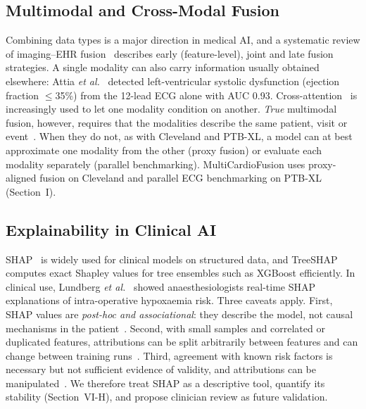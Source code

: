 \subsection{Multimodal and Cross-Modal Fusion}
Combining data types is a major direction in medical AI, and a systematic review of imaging--EHR fusion~\cite{huang2020fusion} describes early (feature-level), joint and late fusion strategies. A single modality can also carry information usually obtained elsewhere: Attia \emph{et al.}~\cite{attia2019} detected left-ventricular systolic dysfunction (ejection fraction $\leq$35\%) from the 12-lead ECG alone with AUC 0.93. Cross-attention~\cite{vaswani2017} is increasingly used to let one modality condition on another. \emph{True} multimodal fusion, however, requires that the modalities describe the same patient, visit or event~\cite{huang2020fusion}. When they do not, as with Cleveland and PTB-XL, a model can at best approximate one modality from the other (proxy fusion) or evaluate each modality separately (parallel benchmarking). MultiCardioFusion uses proxy-aligned fusion on Cleveland and parallel ECG benchmarking on PTB-XL (Section~I).

\subsection{Explainability in Clinical AI}
SHAP~\cite{lundberg2017} is widely used for clinical models on structured data, and TreeSHAP~\cite{lundberg2018tree} computes exact Shapley values for tree ensembles such as XGBoost efficiently. In clinical use, Lundberg \emph{et al.}~\cite{lundberg2018sepsis} showed anaesthesiologists real-time SHAP explanations of intra-operative hypoxaemia risk. Three caveats apply. First, SHAP values are \emph{post-hoc and associational}: they describe the model, not causal mechanisms in the patient~\cite{kumar2020problems}. Second, with small samples and correlated or duplicated features, attributions can be split arbitrarily between features and can change between training runs~\cite{molnar2022pitfalls}. Third, agreement with known risk factors is necessary but not sufficient evidence of validity, and attributions can be manipulated~\cite{slack2020fooling}. We therefore treat SHAP as a descriptive tool, quantify its stability (Section~VI-H), and propose clinician review as future validation.

